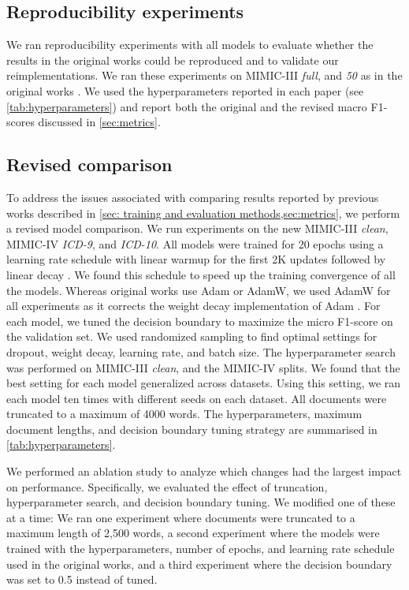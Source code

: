 {\subsection{Reproducibility experiments}

We ran reproducibility experiments with all models to evaluate whether the results in the original works could be reproduced and to validate our reimplementations. We ran these experiments on MIMIC-III \textit{full}, and \textit{50} as in the original works \parencite{mullenbachExplainablePredictionMedical2018,liICDCodingClinical2020,vuLabelAttentionModel2020,huangPLMICDAutomaticICD2022}. We used the hyperparameters reported in each paper (see \cref{tab:hyperparameters}) and report both the original and the revised macro F1-scores discussed in \cref{sec:metrics}.

\subsection{Revised comparison}
To address the issues associated with comparing results reported by previous works described in \cref{sec: training and evaluation methods,sec:metrics}, we perform a revised model comparison. We run experiments on the new MIMIC-III \textit{clean}, MIMIC-IV \textit{ICD-9}, and \textit{ICD-10}.
All models were trained for 20 epochs using a learning rate schedule with linear warmup for the first 2K updates followed by linear decay \parencite{huangPLMICDAutomaticICD2022}. We found this schedule to speed up the training convergence of all the models.
Whereas original works use Adam or AdamW, we used AdamW for all experiments as it corrects the weight decay implementation of Adam \parencite{kingmaAdamMethodStochastic2017, loshchilovDecoupledWeightDecay2022}. For each model, we tuned the decision boundary to maximize the micro F1-score on the validation set. We used randomized sampling to find optimal settings for dropout, weight decay, learning rate, and batch size. The hyperparameter search was performed on MIMIC-III \textit{clean}, and the MIMIC-IV splits. We found that the best setting for each model generalized across datasets. Using this setting, we ran each model ten times with different seeds on each dataset. All documents were truncated to a maximum of 4000 words. The hyperparameters, maximum document lengths, and decision boundary tuning strategy are summarised in \cref{tab:hyperparameters}. 

We performed an ablation study to analyze which changes had the largest impact on performance. 
Specifically, we evaluated the effect of truncation, hyperparameter search, and decision boundary tuning. We modified one of these at a time: We ran one experiment where documents were truncated to a maximum length of 2,500 words, a second experiment where the models were trained with the hyperparameters, number of epochs, and learning rate schedule used in the original works, and a third experiment where the decision boundary was set to 0.5 instead of tuned.

}
